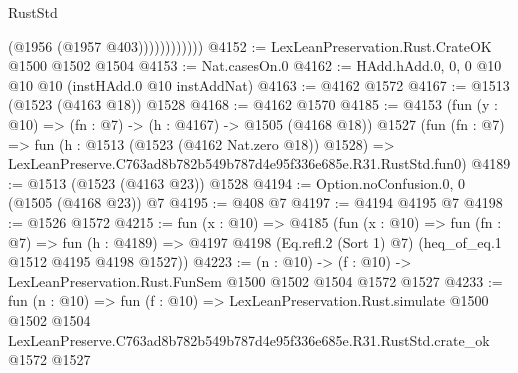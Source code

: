 \begin{lexlean}{RustStd}
\begin{coremodule}
                        (@1956 (@1957 @403))))))))))))
@4152 := LexLeanPreservation.Rust.CrateOK @1500 @1502 @1504
@4153 := Nat.casesOn.{0}
@4162 := HAdd.hAdd.{0, 0, 0} @10 @10 @10 (instHAdd.{0} @10 instAddNat)
@4163 := @4162 @1572
@4167 := @1513 (@1523 (@4163 @18)) @1528
@4168 := @4162 @1570
@4185 := @4153
    (fun (y : @10) => (fn : @7) -> (h : @4167) -> @1505 (@4168 @18))
    @1527
    (fun (fn : @7) =>
    fun (h : @1513 (@1523 (@4162 Nat.zero @18)) @1528) =>
    LexLeanPreserve.C763ad8b782b549b787d4e95f336e685e.R31.RustStd.fun0)
@4189 := @1513 (@1523 (@4163 @23)) @1528
@4194 := Option.noConfusion.{0, 0} (@1505 (@4168 @23)) @7
@4195 := @408 @7
@4197 := @4194 @4195 @7
@4198 := @1526 @1572
@4215 := fun (x : @10) =>
  @4185
    (fun (x : @10) =>
    fun (fn : @7) =>
    fun (h : @4189) =>
    @4197 @4198 (Eq.refl.{2} (Sort 1) @7) (heq_of_eq.{1} @1512 @4195 @4198 @1527))
@4223 := (n : @10) -> (f : @10) -> LexLeanPreservation.Rust.FunSem @1500 @1502 @1504 @1572 @1527
@4233 := fun (n : @10) =>
  fun (f : @10) =>
  LexLeanPreservation.Rust.simulate
    @1500
    @1502
    @1504
    LexLeanPreserve.C763ad8b782b549b787d4e95f336e685e.R31.RustStd.crate_ok
    @1572
    @1527
\end{coremodule}
\end{lexlean}
